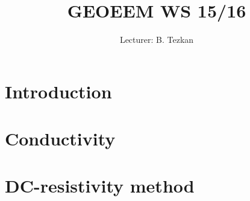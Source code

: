 \documentclass[11pt,a4paper]{article}
\title{GEOEEM WS 15/16}
\author{Lecturer: B. Tezkan}
\numberwithin{equation}{section}
\numberwithin{figure}{section}
\begin{document}
\graphicspath{ {figs/} }

\begin{titlepage}
\maketitle
\thispagestyle{empty}
\end{titlepage}
\newpage
\tableofcontents
\newpage

\setcounter{section}{-1}
\section{Introduction}


\section{Conductivity}

\section{DC-resistivity method}

\end{document}

